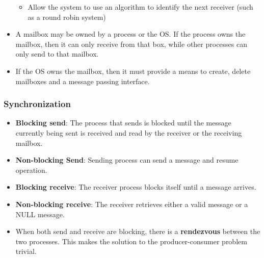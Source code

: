 \documentclass{article}
\theoremstyle{plain}
\theoremstyle{definition}
\begin{document}
\begin{itemize}
\begin{itemize}
        \item Allow the system to use an algorithm to identify the next receiver (such as a round robin system)
    \end{itemize}
    
    \item A mailbox may be owned by a process or the OS. If the process owns the mailbox, then it can only receive from that box, while other processes can only send to that mailbox.
    
    \item If the OS owns the mailbox, then it must provide a means to create, delete mailboxes and a message passing interface. 
\end{itemize}

\subsubsection{Synchronization}
\begin{itemize}
    \item \textbf{Blocking send}: The process that sends is blocked until the message currently being sent is received and read by the receiver or the receiving mailbox. 
    
    \item \textbf{Non-blocking Send}: Sending process can send a message and resume operation.
    
    \item \textbf{Blocking receive}: The receiver process blocks itself until a message arrives.
    
    \item \textbf{Non-blocking receive}: The receiver retrieves either a valid message or a NULL message.
    
    \item When both send and receive are blocking, there is a \textbf{rendezvous} between the two processes. This makes the solution to the producer-consumer problem trivial. 
\end{itemize}
\end{document}
